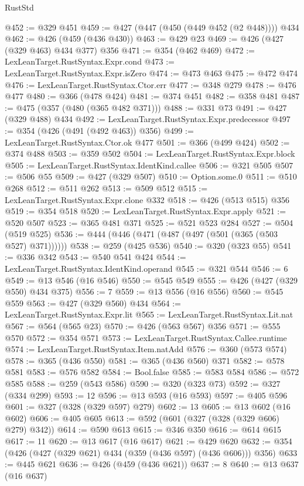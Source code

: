 \begin{lexlean}{RustStd}
\begin{coremodule}
@452 := @329 @451
@459 := @427 (@447 (@450 (@449 @452 (@2 @448)))) @434
@462 := @426 (@459 (@436 @430))
@463 := @429 @23
@469 := @426 (@427 (@329 @463) @434 @377) @356
@471 := @354 (@462 @469)
@472 := LexLeanTarget.RustSyntax.Expr.cond
@473 := LexLeanTarget.RustSyntax.Expr.isZero
@474 := @473 @463
@475 := @472 @474
@476 := LexLeanTarget.RustSyntax.Ctor.err
@477 := @348 @279
@478 := @476 @477
@480 := @366 (@478 @424)
@481 := @374 @451
@482 := @358 @481
@487 := @475 (@357 (@480 (@365 @482 @371)))
@488 := @331 @73
@491 := @427 (@329 @488) @434
@492 := LexLeanTarget.RustSyntax.Expr.predecessor
@497 := @354 (@426 (@491 (@492 @463)) @356)
@499 := LexLeanTarget.RustSyntax.Ctor.ok @477
@501 := @366 (@499 @424)
@502 := @374 @488
@503 := @359 @502
@504 := LexLeanTarget.RustSyntax.Expr.block
@505 := LexLeanTarget.RustSyntax.IdentKind.callee
@506 := @321 @505
@507 := @506 @55
@509 := @427 (@329 @507)
@510 := Option.some.{0}
@511 := @510 @268
@512 := @511 @262
@513 := @509 @512
@515 := LexLeanTarget.RustSyntax.Expr.clone @332
@518 := @426 (@513 @515) @356
@519 := @354 @518
@520 := LexLeanTarget.RustSyntax.Expr.apply
@521 := @520 @507
@523 := @365 @481 @371
@525 := @521 @523 @284
@527 := @504 (@519 @525)
@536 := @444 (@446 (@471 (@487 (@497 (@501 (@365 (@503 @527) @371))))))
@538 := @259 (@425 @536)
@540 := @320 (@323 @55)
@541 := @336 @342
@543 := @540 @541 @424
@544 := LexLeanTarget.RustSyntax.IdentKind.operand
@545 := @321 @544
@546 := 6
@549 := @13 @546 (@16 @546)
@550 := @545 @549
@555 := @426 (@427 (@329 @550) @434 @375)
@556 := 7
@559 := @13 @556 (@16 @556)
@560 := @545 @559
@563 := @427 (@329 @560) @434
@564 := LexLeanTarget.RustSyntax.Expr.lit
@565 := LexLeanTarget.RustSyntax.Lit.nat
@567 := @564 (@565 @23)
@570 := @426 (@563 @567) @356
@571 := @555 @570
@572 := @354 @571
@573 := LexLeanTarget.RustSyntax.Callee.runtime
@574 := LexLeanTarget.RustSyntax.Item.natAdd
@576 := @360 (@573 @574)
@578 := @365 (@436 @550)
@581 := @365 (@436 @560) @371
@582 := @578 @581
@583 := @576 @582
@584 := Bool.false
@585 := @583 @584
@586 := @572 @585
@588 := @259 (@543 @586)
@590 := @320 (@323 @73)
@592 := @327 (@334 @299)
@593 := 12
@596 := @13 @593 (@16 @593)
@597 := @405 @596
@601 := @327 (@328 (@329 @597) @279)
@602 := 13
@605 := @13 @602 (@16 @602)
@606 := @405 @605
@613 := @592 (@601 (@327 (@328 (@329 @606) @279) @342))
@614 := @590 @613
@615 := @346 @350
@616 := @614 @615
@617 := 11
@620 := @13 @617 (@16 @617)
@621 := @429 @620
@632 := @354 (@426 (@427 (@329 @621) @434 (@359 (@436 @597) (@436 @606))) @356)
@633 := @445 @621
@636 := @426 (@459 (@436 @621))
@637 := 8
@640 := @13 @637 (@16 @637)

\end{coremodule}
\end{lexlean}
